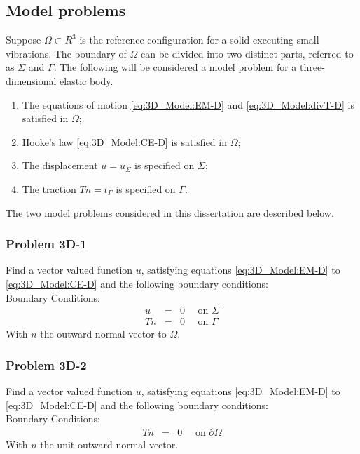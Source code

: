 \documentclass[../../main.tex]{subfiles}
\begin{document}
\subsection{Model problems}\label{ssec:3D_Model:ModelProblems}
Suppose $\Omega \subset R^3$ is the reference configuration for a solid
executing small vibrations. The boundary of $\Omega$ can be divided into two
distinct parts, referred to as $\Sigma$ and $\Gamma$. The following will be
considered a model problem for a three-dimensional elastic body.
\begin{enumerate}
	\item[] The equations of motion \eqref{eq:3D_Model:EM-D} and \eqref{eq:3D_Model:divT-D} is satisfied in $\Omega$;
	\item[] Hooke's law \eqref{eq:3D_Model:CE-D} is satisfied in $\Omega$;
	\item[] The displacement $u = u_\Sigma$ is specified on
		$\Sigma$;
	\item[] The traction $Tn = t_\Gamma$ is specified on
		$\Gamma$.
\end{enumerate} \label{sym:n}\label{sym:SigmaGamma}

The two model problems considered in this dissertation are described below.

\subsubsection{Problem 3D-1}\label{sssec:3D_Model:Problem3D1}
Find a vector valued function $u$, satisfying equations
\eqref{eq:3D_Model:EM-D} to \eqref{eq:3D_Model:CE-D} and the following boundary
conditions:\\

Boundary Conditions:
\begin{eqnarray*}
	u & = & 0 \quad \textrm{ on } \Sigma\\
	Tn & = & 0 \quad \textrm{ on } \Gamma
\end{eqnarray*} With $n$ the outward normal vector to $\Omega$.

\subsubsection{Problem 3D-2}\label{sssec:3D_Model:Problem3D2}
Find a vector valued function $u$, satisfying equations
\eqref{eq:3D_Model:EM-D} to \eqref{eq:3D_Model:CE-D} and the following boundary
conditions:\\

Boundary Conditions:
\begin{eqnarray*}
	Tn & = & 0 \quad \textrm{ on } \partial\Omega
\end{eqnarray*} With $n$ the unit outward normal vector. \label{sym:boundaryOmega}
\end{document}
